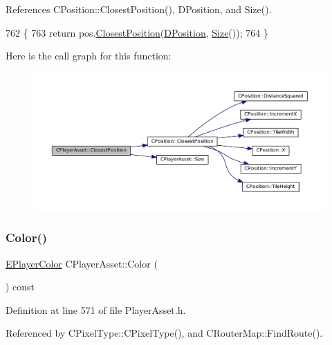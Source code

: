 References C\+Position\+::\+Closest\+Position(), D\+Position, and Size().


\begin{DoxyCode}
762                                                                  \{
763     \textcolor{keywordflow}{return} pos.\hyperlink{classCPosition_a91fd43eeb2c894bcb7577ae87247b726}{ClosestPosition}(\hyperlink{classCPlayerAsset_aa9f53c009b181c7c5647c6b03776a04c}{DPosition}, \hyperlink{classCPlayerAsset_a85a9e2ce62f557e93219676117159fec}{Size}());
764 \}
\end{DoxyCode}
Here is the call graph for this function\+:\nopagebreak
\begin{figure}[H]
\begin{center}
\leavevmode
\includegraphics[width=350pt]{classCPlayerAsset_a67e700ce77122894c02da584dd652767_cgraph}
\end{center}
\end{figure}
\hypertarget{classCPlayerAsset_a969e6e60c6343186d2b9a6cddd6654f8}{}\label{classCPlayerAsset_a969e6e60c6343186d2b9a6cddd6654f8} 
\subsubsection{\texorpdfstring{Color()}{Color()}}
{\footnotesize\ttfamily \hyperlink{GameDataTypes_8h_aafb0ca75933357ff28a6d7efbdd7602f}{E\+Player\+Color} C\+Player\+Asset\+::\+Color (\begin{DoxyParamCaption}{ }\end{DoxyParamCaption}) const\hspace{0.3cm}{\ttfamily [inline]}}



Definition at line 571 of file Player\+Asset.\+h.



Referenced by C\+Pixel\+Type\+::\+C\+Pixel\+Type(), and C\+Router\+Map\+::\+Find\+Route().


